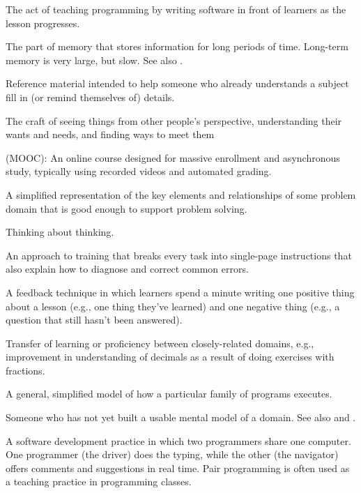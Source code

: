 \begin{description}
 The act of teaching programming by writing
software in front of learners as the lesson progresses.

 The part of memory that stores
information for long periods of time. Long-term memory is very large, but
slow. See also .

 Reference material intended to help someone who
already understands a subject fill in (or remind themselves of) details.

 The craft of seeing things from other people's
perspective, understanding their wants and needs, and finding ways to meet them

 (MOOC): An online course designed
for massive enrollment and asynchronous study, typically using recorded videos
and automated grading.

 A simplified representation of the key
elements and relationships of some problem domain that is good enough to support
problem solving.

 Thinking about thinking.

 An approach to training that breaks
every task into single-page instructions that also explain how to diagnose and
correct common errors.

 A feedback technique in which learners
spend a minute writing one positive thing about a lesson (e.g., one thing
they've learned) and one negative thing (e.g., a question that still hasn't been
answered).

 Transfer of learning or proficiency
between closely-related domains, e.g., improvement in understanding of decimals
as a result of doing exercises with fractions.

 A general, simplified model of how
a particular family of programs executes.

 Someone who has not yet built a usable mental model of
a domain. See also 
and .

 A software development practice in
which two programmers share one computer. One programmer (the driver) does the
typing, while the other (the navigator) offers comments and suggestions in real
time. Pair programming is often used as a teaching practice in programming
classes.


\end{description}
